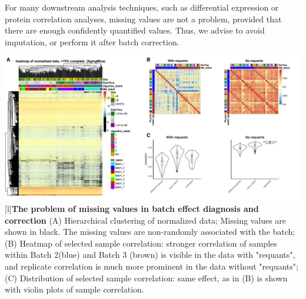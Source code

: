 \documentclass[num-refs]{wiley-article}
\begin{document}
{\begin{tcolorbox}
		For many downstream analysis techniques, such as differential expression or protein correlation analyses, missing values are not a problem, provided that there are enough confidently quantified values. Thus, we advise to avoid imputation, or perform it after batch correction. 
		
		\begin{minipage}[h]{\linewidth}
			\includegraphics[width=.9\textwidth]{figures/Fig4_missing_values.pdf}
			[l]{\textbf{The problem of missing values in batch effect diagnosis and correction} }
			\label{fig:batch_fig4_missing_values}
			{\footnotesize  (A) Hierarchical clustering of normalized data; Missing values are shown in black. The missing values are non-randomly associated with the batch;
				(B) Heatmap of selected sample correlation: stronger correlation of samples within Batch 2(blue) and Batch 3 (brown) is visible in the data with "requants", and replicate correlation is much more prominent in the data without "requants";
				(C) Distribution of selected sample correlation: same effect, as in (B) is shown with violin plots of sample correlation.}
		\end{minipage}
	\end{tcolorbox}
	\clearpage
}
\end{document}
